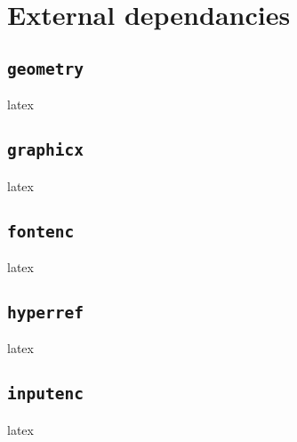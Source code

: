 \documentclass{report}
\begin{document}
\subsubsection{\texttt{\imtaMaketitlepage}}
\subsubsection{\texttt{\imtaMakeCover}}

\section{External dependancies}

\subsection{\texttt{geometry}}
\begin{imtaCode}{latex}
\RequirePackage[a4paper, margin=2cm, top=3cm]{geometry}
\end{imtaCode}

\subsection{\texttt{graphicx}}
\begin{imtaCode}{latex}
\RequirePackage{graphicx}
\end{imtaCode}

\subsection{\texttt{fontenc}}
\begin{imtaCode}{latex}
\RequirePackage[T1]{fontenc}
\end{imtaCode}

\subsection{\texttt{hyperref}}
\begin{imtaCode}{latex}
\RequirePackage[hidelinks]{hyperref}
\end{imtaCode}

\subsection{\texttt{inputenc}}
\begin{imtaCode}{latex}
\RequirePackage[utf8]{inputenc}
\end{imtaCode}
\end{document}
